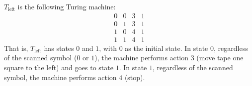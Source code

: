 $T_{\text{left}}$ is the following Turing machine:
\[
\begin{array}{cccc}
0 & 0 & 3 & 1 \\
0 & 1 & 3 & 1 \\
1 & 0 & 4 & 1 \\
1 & 1 & 4 & 1
\end{array}
\]
That is, $T_{\text{left}}$ has states $0$ and $1$, with $0$ as the initial state. In state $0$, regardless of the scanned symbol ($0$ or $1$), the machine performs action $3$ (move tape one square to the left) and goes to state $1$. In state $1$, regardless of the scanned symbol, the machine performs action $4$ (stop).
